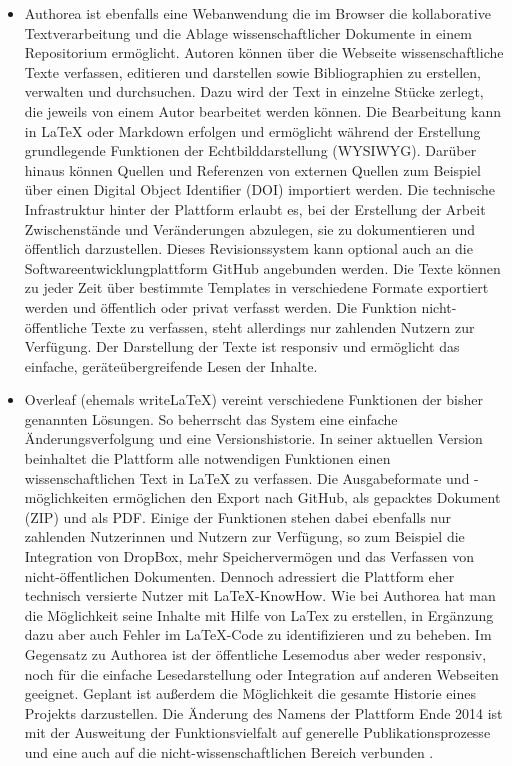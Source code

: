 \begin{itemize}
\item Authorea ist ebenfalls eine Webanwendung die im Browser die kollaborative Textverarbeitung  und die Ablage wissenschaftlicher Dokumente in einem Repositorium ermöglicht. Autoren können über die Webseite wissenschaftliche Texte verfassen, editieren und darstellen sowie Bibliographien zu erstellen, verwalten und durchsuchen. Dazu wird der Text in einzelne Stücke zerlegt, die jeweils von einem Autor bearbeitet werden können. Die Bearbeitung kann in LaTeX oder Markdown erfolgen und ermöglicht während der Erstellung grundlegende Funktionen der Echtbilddarstellung (WYSIWYG). Darüber hinaus können Quellen und Referenzen von externen Quellen zum Beispiel über einen Digital Object Identifier (DOI) importiert werden. Die technische Infrastruktur hinter der Plattform erlaubt es, bei der Erstellung der Arbeit Zwischenstände und Veränderungen abzulegen, sie zu dokumentieren und öffentlich darzustellen. Dieses Revisionssystem kann optional auch an die Softwareentwicklungplattform GitHub angebunden werden. Die Texte können zu jeder Zeit über bestimmte Templates in verschiedene Formate exportiert werden und öffentlich oder privat verfasst werden. Die Funktion nicht-öffentliche Texte zu verfassen, steht allerdings nur zahlenden Nutzern zur Verfügung. Der Darstellung der Texte ist responsiv und ermöglicht das einfache, geräteübergreifende Lesen der Inhalte.
\item Overleaf (ehemals writeLaTeX) vereint verschiedene Funktionen der bisher genannten Lösungen. So beherrscht das System eine einfache Änderungsverfolgung und eine Versionshistorie. In seiner aktuellen Version beinhaltet die Plattform alle notwendigen Funktionen einen wissenschaftlichen Text in LaTeX zu verfassen. Die Ausgabeformate und -möglichkeiten ermöglichen den Export nach GitHub, als gepacktes Dokument (ZIP) und als PDF. Einige der Funktionen stehen dabei ebenfalls nur zahlenden Nutzerinnen und Nutzern zur Verfügung, so zum Beispiel die Integration von DropBox, mehr Speichervermögen und das Verfassen von nicht-öffentlichen Dokumenten. Dennoch adressiert die Plattform eher technisch versierte Nutzer mit LaTeX-KnowHow. Wie bei Authorea hat man die Möglichkeit seine Inhalte mit Hilfe von LaTex zu erstellen, in Ergänzung dazu aber auch Fehler im LaTeX-Code zu identifizieren und zu beheben. Im Gegensatz zu Authorea ist der öffentliche Lesemodus aber weder responsiv, noch für die einfache Lesedarstellung oder Integration auf anderen Webseiten geeignet. Geplant ist außerdem die Möglichkeit die gesamte Historie eines Projekts darzustellen. Die Änderung des Namens der Plattform Ende 2014 ist mit der Ausweitung der Funktionsvielfalt auf generelle Publikationsprozesse und eine auch auf die nicht-wissenschaftlichen Bereich verbunden \cite{overleaf_2014}.

\end{itemize}
